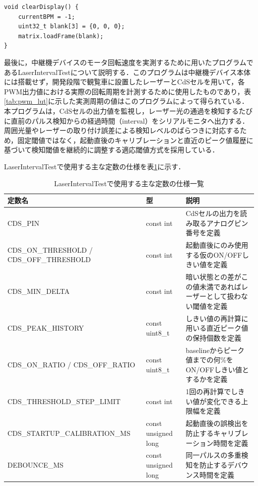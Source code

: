 \begin{lstlisting}[caption={clearDisplay関数}, label={lst:disp_cleardisplay}]
void clearDisplay() {
    currentBPM = -1;
    uint32_t blank[3] = {0, 0, 0};
    matrix.loadFrame(blank);
}
\end{lstlisting}


最後に，中継機デバイスのモータ回転速度を実測するために用いたプログラムであるLaserIntervalTestについて説明する．このプログラムは中継機デバイス本体には搭載せず，開発段階で観覧車に設置したレーザーとCdSセルを用いて，各PWM出力値における実際の回転周期を計測するために使用したものであり，表\ref{tab:pwm_lut}に示した実測周期の値はこのプログラムによって得られている．
本プログラムは，CdSセルの出力値を監視し，レーザー光の通過を検知するたびに直前のパルス検知からの経過時間（interval）をシリアルモニタへ出力する．周囲光量やレーザーの取り付け誤差による検知レベルのばらつきに対応するため，固定閾値ではなく，起動直後のキャリブレーションと直近のピーク値履歴に基づいて検知閾値を継続的に調整する適応閾値方式を採用している．

\iffalse
LaserIntervalTestで使用する主な定数の仕様を表\ref{table:laser_const}に示す．

\begin{table}[H]
    \caption{LaserIntervalTestで使用する主な定数の仕様一覧}
    \centering
    \label{table:laser_const}
    \small
    \begin{tabular}{p{5.2cm}p{2.6cm}p{5.9cm}}
    \hline
    \textbf{定数名} & \textbf{型} & \textbf{説明}\\
    \hline
    CDS\_PIN & const int & CdSセルの出力を読み取るアナログピン番号を定義\\
    \hline
    CDS\_ON\_THRESHOLD / CDS\_OFF\_THRESHOLD & const int & 起動直後にのみ使用する仮のON/OFFしきい値を定義\\
    \hline
    CDS\_MIN\_DELTA & const int & 暗い状態との差がこの値未満であればレーザーとして扱わない閾値を定義\\
    \hline
    CDS\_PEAK\_HISTORY & const uint8\_t & しきい値の再計算に用いる直近ピーク値の保持個数を定義\\
    \hline
    CDS\_ON\_RATIO / CDS\_OFF\_RATIO & const uint8\_t & baselineからピーク値までの何\%をON/OFFしきい値とするかを定義\\
    \hline
    CDS\_THRESHOLD\_STEP\_LIMIT & const int & 1回の再計算でしきい値が変化できる上限幅を定義\\
    \hline
    CDS\_STARTUP\_CALIBRATION\_MS & const unsigned long & 起動直後の誤検出を防止するキャリブレーション時間を定義\\
    \hline
    DEBOUNCE\_MS & const unsigned long & 同一パルスの多重検知を防止するデバウンス時間を定義\\
    \hline
    \end{tabular}
\end{table}

